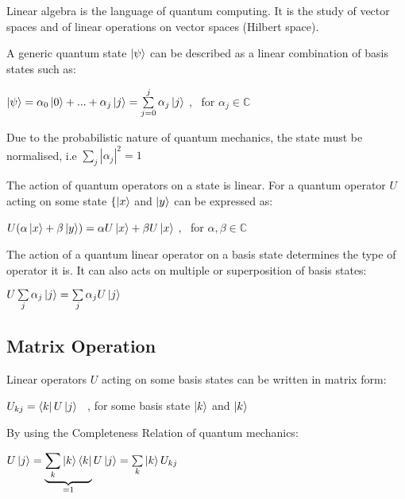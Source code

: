 \documentclass{article}
\begin{document}
\noindent
Linear algebra is the language of quantum computing. It is the study of vector spaces and of linear operations on vector
spaces (Hilbert space).
\vspace{5mm}

\noindent
A generic quantum state $\ket{\psi}$ can be described as a linear combination of basis states such as:
\vspace{5mm}


\qquad $\ket{\psi} = \alpha_0\ket{0} + ... + \alpha_j\ket{j} = \sum\limits_{j = 0}^{j} \alpha_j\ket{j}$ , \ for $\alpha_j \in \mathbb{C}$
\vspace{5mm}

\noindent
Due to the probabilistic nature of quantum mechanics, the state must be normalised, i.e $\sum\limits_j |\alpha_j|^2 = 1$
\vspace{5mm}

\noindent
The action of quantum operators on a state is linear. For a quantum operator $U$ acting on some state $\{\ket{x}$ and $\ket{y}$ can be expressed as:
\vspace{5mm}

\noindent
\qquad $U(\alpha\ket{x} + \beta\ket{y}) = \alpha U\ket{x} + \beta U\ket{x}$ , \ for $\alpha, \beta \in \mathbb{C}$
\vspace{5mm}

\noindent
The action of a quantum linear operator on a basis state determines the type of operator it is. It can also acts on multiple or superposition of basis states:
\vspace{5mm}

\noindent
\qquad $U \sum\limits_j \alpha_j \ket{j} = \sum\limits_j \alpha_j U\ket{j}$
\vspace{10mm}

\subsection{Matrix Operation}
\vspace{5mm}

\noindent
Linear operators $U$ acting on some basis states can be written in matrix form:

\qquad $U_{kj} = \bra{k}U\ket{j}$ \ , for some basis state $\ket{k}$ and $\ket{k}$
\vspace{5mm}

\noindent
By using the Completeness Relation of quantum mechanics:
\vspace{5mm}

\qquad $U\ket{j} = \underbrace{\sum\limits_k\ket{k}\bra{k}}_{ = 1} U\ket{j} = \sum\limits_k \ket{k} U_{kj}$
\vspace{5mm}
\end{document}
